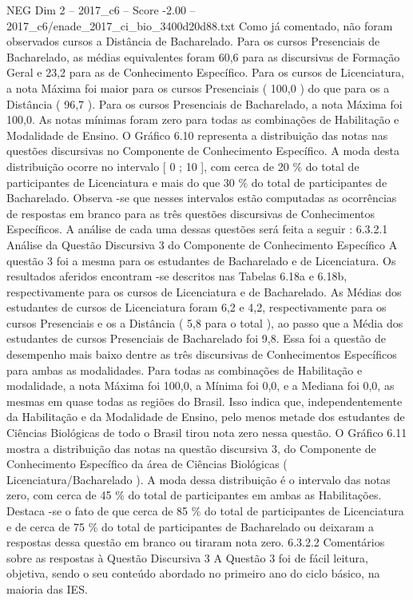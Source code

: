 \begin{textsample}{NEG Dim 2 – 2017\_c6 – Score -2.00 – 2017\_c6/enade\_2017\_ci\_bio\_3400d20d88.txt}
Como já comentado, não foram observados cursos a Distância de Bacharelado.
Para os cursos Presenciais de Bacharelado, as médias equivalentes foram 60,6 para as discursivas de Formação Geral e 23,2 para as de Conhecimento Específico.
Para os cursos de Licenciatura, a nota Máxima foi maior para os cursos Presenciais ( 100,0 ) do que para os a Distância ( 96,7 ).
Para os cursos Presenciais de Bacharelado, a nota Máxima foi 100,0.
As notas mínimas foram zero para todas as combinações de Habilitação e Modalidade de Ensino.
O Gráfico 6.10 representa a distribuição das notas nas questões discursivas no Componente de Conhecimento Específico.
A moda desta distribuição ocorre no intervalo [ 0 ; 10 ], com cerca de 20 \% do total de participantes de Licenciatura e mais do que 30 \% do total de participantes de Bacharelado.
Observa -se que nesses intervalos estão computadas as ocorrências de respostas em branco para as três questões discursivas de Conhecimentos Específicos.
A análise de cada uma dessas questões será feita a seguir : 6.3.2.1 Análise da Questão Discursiva 3 do Componente de Conhecimento Específico A questão 3 foi a mesma para os estudantes de Bacharelado e de Licenciatura.
Os resultados aferidos encontram -se descritos nas Tabelas 6.18a e 6.18b, respectivamente para os cursos de Licenciatura e de Bacharelado.
As Médias dos estudantes de cursos de Licenciatura foram 6,2 e 4,2, respectivamente para os cursos Presenciais e os a Distância ( 5,8 para o total ), ao passo que a Média dos estudantes de cursos Presenciais de Bacharelado foi 9,8.
Essa foi a questão de desempenho mais baixo dentre as três discursivas de Conhecimentos Específicos para ambas as modalidades.
Para todas as combinações de Habilitação e modalidade, a nota Máxima foi 100,0, a Mínima foi 0,0, e a Mediana foi 0,0, as mesmas em quase todas as regiões do Brasil.
Isso indica que, independentemente da Habilitação e da Modalidade de Ensino, pelo menos metade dos estudantes de Ciências Biológicas de todo o Brasil tirou nota zero nessa questão.
O Gráfico 6.11 mostra a distribuição das notas na questão discursiva 3, do Componente de Conhecimento Específico da área de Ciências Biológicas ( Licenciatura/Bacharelado ).
A moda dessa distribuição é o intervalo das notas zero, com cerca de 45 \% do total de participantes em ambas as Habilitações.
Destaca -se o fato de que cerca de 85 \% do total de participantes de Licenciatura e de cerca de 75 \% do total de participantes de Bacharelado ou deixaram a respostas dessa questão em branco ou tiraram nota zero. 6.3.2.2 Comentários sobre as respostas à Questão Discursiva 3 A Questão 3 foi de fácil leitura, objetiva, sendo o seu conteúdo abordado no primeiro ano do ciclo básico, na maioria das IES.

\end{textsample}
